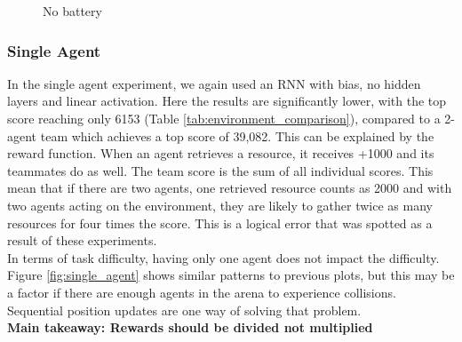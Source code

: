 \documentclass[12pt]{article}
\begin{document}
\begin{appendices}
\begin{figure}[!tbp]
  \caption{No battery}
  \label{fig:no_battery}
\end{figure}

\subsubsection{Single Agent}

In the single agent experiment, we again used an RNN with bias, no hidden layers and linear activation. Here the results are significantly lower, with the top score reaching only 6153 (Table \ref{tab:environment_comparison}), compared to a 2-agent team which achieves a top score of 39,082. This can be explained by the reward function. When an agent retrieves a resource, it receives +1000 and its teammates do as well. The team score is the sum of all individual scores. This mean that if there are two agents, one retrieved resource counts as 2000 and with two agents acting on the environment, they are likely to gather twice as many resources for four times the score. This is a logical error that was spotted as a result of these experiments.\\

In terms of task difficulty, having only one agent does not impact the difficulty. Figure \ref{fig:single_agent} shows similar patterns to previous plots, but this may be a factor if there are enough agents in the arena to experience collisions. Sequential position updates are one way of solving that problem.\\

\textbf{Main takeaway: Rewards should be divided not multiplied}

\begin{figure}[!tbp]
  \centering
  \hfill
  \hfill
  

\end{figure}
\end{appendices}
\end{document}
